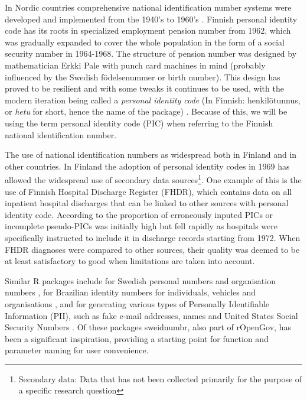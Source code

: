 In Nordic countries comprehensive national identification number systems were developed and implemented from the 1940's to 1960's \citep{watson2010}. Finnish personal identity code has its roots in specialized employment pension number from 1962, which was gradually expanded to cover the whole population in the form of a social security number in 1964-1968. The structure of pension number was designed by mathematician Erkki Pale with punch card machines in mind (probably influenced by the Swedish födelsenummer or birth number). This design has proved to be resilient and with some tweaks it continues to be used, with the modern iteration being called a \emph{personal identity code} (In Finnish: henkilötunnus, or \emph{hetu} for short, hence the name of the package) \citep{salste2021}. Because of this, we will be using the term personal identity code (PIC) when referring to the Finnish national identification number.

The use of national identification numbers as widespread both in Finland and in other countries. In Finland the adoption of personal identity codes in 1969 has allowed the widespread use of secondary data sources\footnote{Secondary data: Data that has not been collected primarily for the purpose of a specific research question}. One example of this is the use of Finnish Hospital Discharge Register (FHDR), which contains data on all inpatient hospital discharges that can be linked to other sources with personal identity code. According to \citet{reijosund} the proportion of erroneously inputed PICs or incomplete pseudo-PICs was initially high but fell rapidly as hospitals were specifically instructed to include it in discharge records starting from 1972. When FHDR diagnoses were compared to other sources, their quality was deemed to be at least satisfactory to good when limitations are taken into account.


Similar R packages include  for Swedish personal numbers and organisation numbers \citep{sweidnumbr},  for Brazilian identity numbers for individuals, vehicles and organisations \citep{numbersbr}, and  for generating various types of Personally Identifiable Information (PII), such as fake e-mail addresses, names and United States Social Security Numbers \citep{generator}. Of these packages sweidnumbr, also part of rOpenGov, has been a significant inspiration, providing a starting point for function and parameter naming for user convenience.

